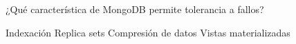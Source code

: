 \question[1] ¿Qué característica de MongoDB permite tolerancia a fallos?
\begin{choices}
\choice Indexación
\CorrectChoice Replica sets
\choice Compresión de datos
\choice Vistas materializadas
\end{choices}